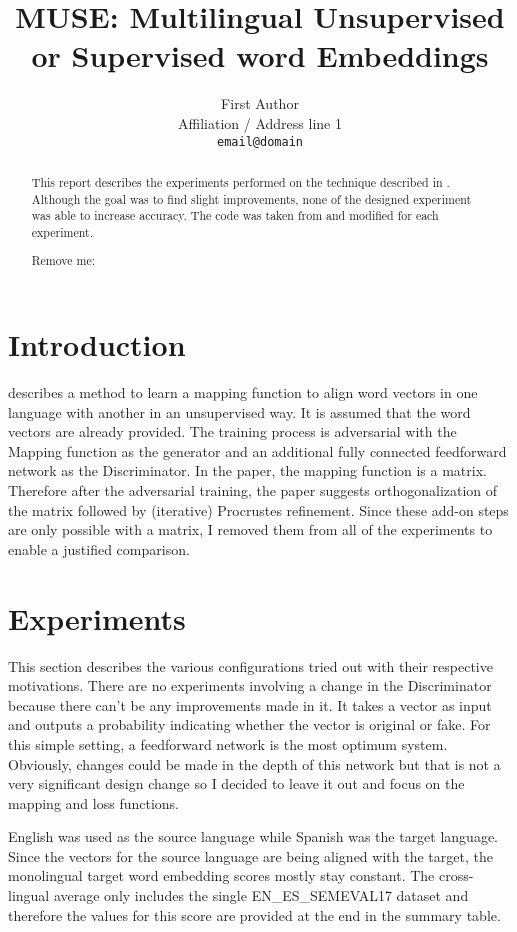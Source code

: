 \documentclass[11pt]{article}
\title{MUSE: Multilingual Unsupervised or Supervised word Embeddings}
\author{First Author \\
  Affiliation / Address line 1 \\
  {\tt email@domain}}
\date{}
\begin{document}
\maketitle
\begin{abstract}
This report describes the experiments performed on the technique described in \cite{conneau2017word}. Although the goal was to find slight improvements, none of the designed experiment was able to increase accuracy. The code was taken from \cite{muserepo} and modified for each experiment.

Remove me: \cite{lample2017unsupervised}

\end{abstract}

\section{Introduction}
\cite{conneau2017word} describes a method to learn a mapping function to align word vectors in one language with another in an unsupervised way. It is assumed that the word vectors are already provided. The training process is adversarial with the Mapping function as the generator and an additional fully connected feedforward network as the Discriminator. In the paper, the mapping function is a matrix. Therefore after the adversarial training, the paper suggests orthogonalization of the matrix followed by (iterative) Procrustes refinement. Since these add-on steps are only possible with a matrix, I removed them from all of the experiments to enable a justified comparison.

\section{Experiments}
This section describes the various configurations tried out with their respective motivations. There are no experiments involving a change in the Discriminator because there can't be any improvements made in it. It takes a vector as input and outputs a probability indicating whether the vector is original or fake. For this simple setting, a feedforward network is the most optimum system. Obviously, changes could be made in the depth of this network but that is not a very significant design change so I decided to leave it out and focus on the mapping and loss functions.

English was used as the source language while Spanish was the target language. Since the vectors for the source language are being aligned with the target, the monolingual target word embedding scores mostly stay constant. The cross-lingual average only includes the single EN\_ES\_SEMEVAL17 dataset and therefore the values for this score are provided at the end in the summary table.
\end{document}
